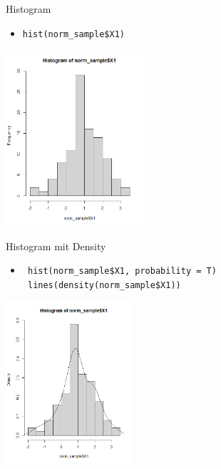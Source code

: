 \documentclass[xcolor=dvipsnames, aspectratio = 169]{beamer}
\begin{document}
\begin{frame}[fragile]{Histogram}
	\begin{itemize}
		\item \verb+hist(norm_sample$X1) +
	\end{itemize}
			
	\begin{center}
		\includegraphics[height=6.5cm]{Histogram}
	\end{center}
\end{frame}

\begin{frame}[fragile]{Histogram mit Density}
	\begin{itemize}
		\item \verb+ hist(norm_sample$X1, probability = T)+ \\ \verb + lines(density(norm_sample$X1))+
	\end{itemize}
			
	\begin{center}
		\includegraphics[height=6cm]{Density}
	\end{center}
\end{frame}
\end{document}
